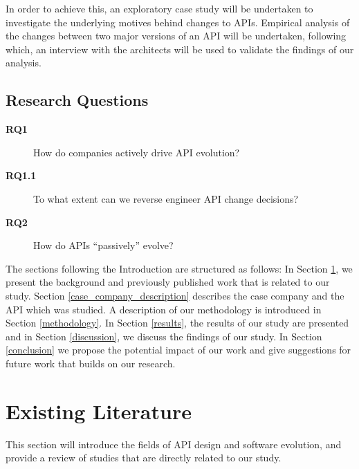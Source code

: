 \documentclass{sig-alternate}
\begin{document}
In order to achieve this, an exploratory case study will be undertaken to investigate the underlying motives behind changes to APIs. Empirical analysis of the changes between two major versions of an API will be undertaken, following which, an interview with the architects will be used to validate the findings of our analysis. 



\subsection{Research Questions} \label{rqs}
\begin{description}
\item[\textbf{RQ1}] How do companies actively drive API evolution?
\item[\textbf{RQ1.1}] To what extent can we reverse engineer API change decisions?
\item[\textbf{RQ2}] How do APIs ``passively'' evolve?


\end{description}

The sections following the Introduction are structured as follows: In Section \ref{existing_literature}, we present the background and previously published work that is related to our study. Section \ref{case_company_description} describes the case company and the API which was studied. A description of our methodology is introduced in Section \ref{methodology}. In Section \ref{results}, the results of our study are presented and in Section \ref{discussion}, we discuss the findings of our study. In Section \ref{conclusion} we propose the potential impact of our work and give suggestions for future work that builds on our research. 

\section{Existing Literature} \label{existing_literature}
This section will introduce the fields of API design and software evolution, and provide a review of studies that are directly related to our study. 
\end{document}
